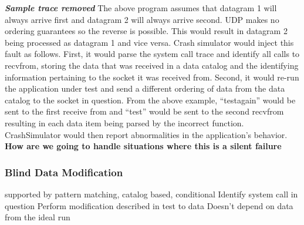             \textbf{\emph{Sample trace removed}}
            The above program assumes that datagram 1 will always arrive first and datagram 2 will always arrive second. UDP
            makes no ordering guarantees so the reverse is possible. This would result in datagram 2 being processed as
            datagram 1 and vice versa. Crash simulator would inject this fault as follows. First, it would parse the system
            call trace and identify all calls to recvfrom, storing the data that was received in a data catalog and the
            identifying information pertaining to the socket it was received from. Second, it would re-run the application
            under test and send a different ordering of data from the data catalog to the socket in question. From the above
            example, ``testagain'' would be sent to the first receive from and ``test'' would be sent to the second recvfrom
            resulting in each data item being parsed by the incorrect function. CrashSimulator would then report
            abnormalities in the application's behavior. \textbf{How are we going to handle situations where this is a
            silent failure}

        \subsubsection{Blind Data Modification}

            supported by pattern matching, catalog based, conditional
            Identify system call in question
            Perform modification described in test to data
            Doesn't depend on data from the ideal run
